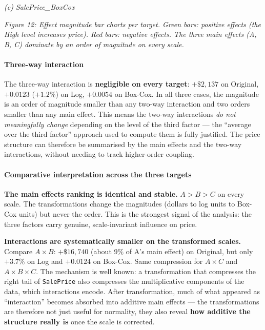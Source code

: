 \emph{(c) SalePrice\_BoxCox}

\emph{Figure 12: Effect magnitude bar charts per target. Green bars:
positive effects (the High level increases price). Red bars: negative
effects. The three main effects (A, B, C) dominate by an order of
magnitude on every scale.}

\paragraph{Three-way interaction}\label{three-way-interaction}

The three-way interaction is \textbf{negligible on every target}:
\(+\$2{,}137\) on Original, \(+0.0123\) (\(+1.2\%\)) on Log, \(+0.0054\)
on Box-Cox. In all three cases, the magnitude is an order of magnitude
smaller than any two-way interaction and two orders smaller than any
main effect. This means the two-way interactions \emph{do not
meaningfully change} depending on the level of the third factor --- the
``average over the third factor'' approach used to compute them is fully
justified. The price structure can therefore be summarised by the main
effects and the two-way interactions, without needing to track
higher-order coupling.

\paragraph{Comparative interpretation across the three
targets}\label{comparative-interpretation-across-the-three-targets}

\textbf{The main effects ranking is identical and stable.} \(A > B > C\)
on every scale. The transformations change the magnitudes (dollars to
log units to Box-Cox units) but never the order. This is the strongest
signal of the analysis: the three factors carry genuine, scale-invariant
influence on price.

\textbf{Interactions are systematically smaller on the transformed
scales.} Compare \(A \times B\): \(+\$16{,}740\) (about 9\% of A's main
effect) on Original, but only \(+3.7\%\) on Log and \(+0.0124\) on
Box-Cox. Same compression for \(A \times C\) and
\(A \times B \times C\). The mechanism is well known: a transformation
that compresses the right tail of \texttt{SalePrice} also compresses the
multiplicative components of the data, which interactions encode. After
transformation, much of what appeared as ``interaction'' becomes
absorbed into additive main effects --- the transformations are
therefore not just useful for normality, they also reveal \textbf{how
additive the structure really is} once the scale is corrected.

